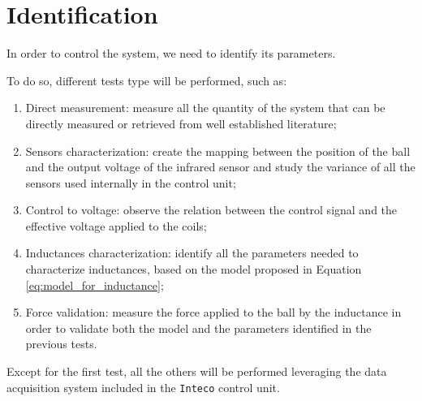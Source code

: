 \section{Identification}
\label{sec:identification}

In order to control the system, we need to identify its parameters.

To do so, different tests type will be performed, such as:

\begin{enumerate}
    \item Direct measurement: measure all the quantity of the system that can be directly measured or retrieved from well established literature;
    \item Sensors characterization: create the mapping between the position of the ball and the output voltage of the infrared sensor and study the variance of all the sensors used internally in the control unit;
    \item Control to voltage: observe the relation between the control signal and the effective voltage applied to the coils;
    \item Inductances characterization: identify all the parameters needed to characterize inductances, based on the model proposed in Equation \ref{eq:model_for_inductance};
    \item Force validation: measure the force applied to the ball by the inductance in order to validate both the model and the parameters identified in the previous tests.
\end{enumerate}

Except for the first test, all the others will be performed leveraging the data acquisition system included in the \texttt{Inteco} control unit.





